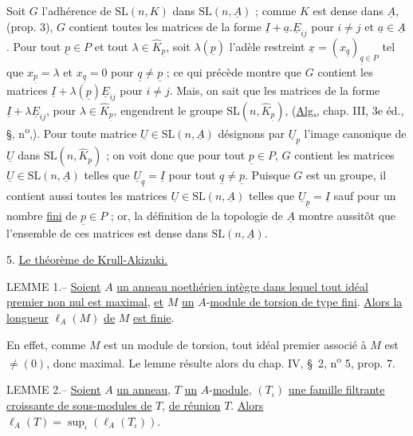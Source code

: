 Soit $G$ l'adhérence de $\mathrm{SL}(n,K)$ dans $\mathrm{SL}(n,\underline A)$ ; comme $K$ est dense dans $\underline A$, (prop. 3), $G$ contient toutes les matrices de la forme $\underline I+\underline a.\underline E_{ij}$ pour $i\ne j$ et $\underline a\in\underline A$. Pour tout $\underline p\in P$ et tout $\lambda\in\widehat K_{\underline p}$, soit $\lambda(\underline p)$ l'adèle restreint $\underline x=(x_{\underline q})_{\underline q\in P}$ tel que $x_{\underline p}=\lambda$ et $x_{\underline q}=0$ pour $\underline q\ne\underline p$ ; ce qui précède montre que $G$ contient les matrices $\underline I+\lambda(\underline p)\underline E_{ij}$ pour $i\ne j$. Mais, on sait que les matrices de la forme $\underline I+\lambda\underline E_{ij}$, pour $\lambda\in\widehat K_{\underline p}$, engendrent le groupe $\mathrm{SL}(n,\widehat K_{\underline p})$, (\uline{Alg.}, chap. III, 3e éd., \S\quad, n\textsuperscript{o}\quad,\quad). Pour toute matrice $\underline U\in\mathrm{SL}(n,\underline A)$ désignons par $\underline U_{\underline p}$ l'image canonique de $\underline U$ dans $\mathrm{SL}(n,\widehat K_{\underline p})$ ; on voit donc que pour tout $\underline p\in P$, $G$ contient les matrices $\underline U\in\mathrm{SL}(n,\underline A)$ telles que $\underline U_{\underline q}=\underline I$ pour tout $\underline q\ne\underline p$. Puisque $G$ est un groupe, il contient aussi toutes les matrices $\underline U\in\mathrm{SL}(n,\underline A)$ telles que $\underline U_{\underline p}=\underline I$ sauf pour un nombre \uline{fini} de $\underline p\in P$ ; or, la définition de la topologie de $\underline A$ montre aussitôt que l'ensemble de ces matrices est dense dans $\mathrm{SL}(n,\underline A)$.

5. \uline{Le théorème de Krull-Akizuki.}

LEMME 1.-- \uline{Soient} $A$ \uline{un anneau noethérien intègre dans lequel tout idéal premier non nul est maximal}, \uline{et} $M$ \uline{un} $A$-\uline{module de torsion de type fini}. \uline{Alors la longueur} $\ell_A(M)$ \uline{de} $M$ \uline{est finie}.

En effet, comme $M$ est un module de torsion, tout idéal premier associé à $M$ est $\ne(0)$, donc maximal. Le lemme résulte alors du chap. IV, \S\ 2, n\textsuperscript{o} 5, prop. 7.

LEMME 2.-- \uline{Soient} $A$ \uline{un anneau}, $T$ \uline{un} $A$-\uline{module}, $(T_\iota)$ \uline{une famille filtrante croissante de sous-modules de} $T$, \uline{de réunion} $T$. \uline{Alors} $\ell_A(T)=\sup_\iota(\ell_A(T_\iota))$.

